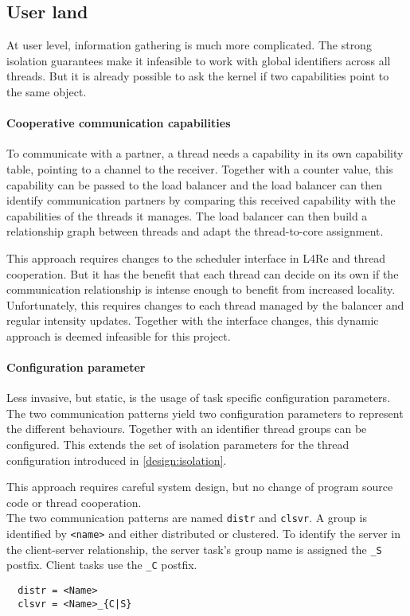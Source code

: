 \subsection{User land}
At user level, information gathering is much more complicated.
The strong isolation guarantees make it infeasible to work with global
identifiers across all threads.
But it is already possible to ask the kernel if two capabilities point to the
same object.

\paragraph{Cooperative communication capabilities}
To communicate with a partner, a thread needs a capability in its own
capability table, pointing to a channel to the receiver.
Together with a counter value, this capability can be passed to the load
balancer and the load balancer can then identify communication partners
by comparing this received capability with the capabilities of the threads
it manages.
The load balancer can then build a relationship graph between threads and adapt
the thread-to-core assignment.

This approach requires changes to the scheduler interface in L4Re and
thread cooperation.
But it has the benefit that each thread can decide on its own if the
communication relationship is intense enough to benefit from increased
locality.
Unfortunately, this requires changes to each thread managed by the balancer and
regular intensity updates.
Together with the interface changes, this dynamic approach is deemed infeasible
for this project.

\paragraph{Configuration parameter}
Less invasive, but static, is the usage of task specific configuration parameters.
The two communication patterns yield two configuration parameters to represent the
different behaviours.
Together with an identifier thread groups can be configured.
This extends the set of isolation parameters for the thread configuration
introduced in \ref{design:isolation}.

This approach requires careful system design, but no change of program source
code or thread cooperation.
\\

The two communication patterns are named \texttt{distr} and \texttt{clsvr}.
A group is identified by \texttt{<name>} and either distributed or clustered.
To identify the server in the client-server relationship, the server task's
group name is assigned the \texttt{\_S} postfix.
Client tasks use the \texttt{\_C} postfix.

\begin{lstlisting}
  distr = <Name>
  clsvr = <Name>_{C|S}
\end{lstlisting}
